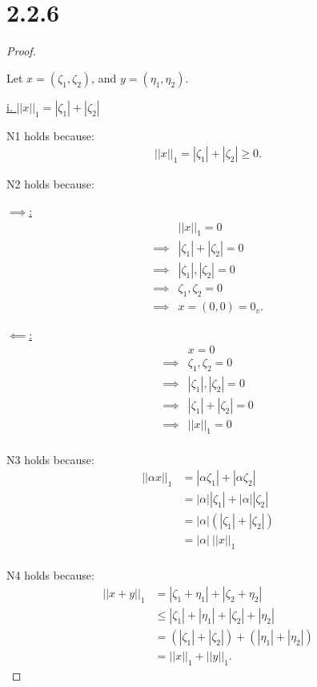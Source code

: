 \documentclass{article}
\begin{document}
\section*{2.2.6}
\begin{proof}
  $ $

  Let $x = (\zeta_1, \zeta_2)$, and $y = (\eta_1, \eta_2)$.
  \newline

  \underline{i. $||x||_1 = |\zeta_1| + |\zeta_2|$}
  \newline

  N1 holds because:
  \begin{align*}
    ||x||_1 = |\zeta_1| + |\zeta_2| \geq 0.
  \end{align*}

  N2 holds because:

  \underline{$\implies$:}
  \begin{align*}
    & ||x||_1 = 0 \\
    \implies& |\zeta_1| + |\zeta_2| = 0 \\
    \implies& |\zeta_1|, |\zeta_2| = 0 \\
    \implies& \zeta_1, \zeta_2 = 0 \\
    \implies& x = (0, 0) = 0_v.
  \end{align*}

  \underline{$\impliedby$:}
  \begin{align*}
    & x = 0 \\
    \implies& \zeta_1, \zeta_2 = 0 \\
    \implies& |\zeta_1|, |\zeta_2| = 0 \\
    \implies& |\zeta_1| + |\zeta_2| = 0 \\
    \implies& ||x||_1 = 0 \\
  \end{align*}

  N3 holds because:
  \begin{align*}
    ||\alpha x||_1 
    &= |\alpha \zeta_1| + |\alpha \zeta_2| \\
    &= |\alpha| |\zeta_1| + |\alpha| |\zeta_2| \\
    &= |\alpha| (|\zeta_1| + |\zeta_2|) \\
    &= |\alpha| \: ||x||_1 \\
  \end{align*}

  N4 holds because:
  \begin{align*}
    ||x+y||_1
    &= |\zeta_1 + \eta_1| + |\zeta_2 + \eta_2| \\
    &\leq |\zeta_1| + |\eta_1| + |\zeta_2| + |\eta_2| \\
    &= (|\zeta_1| + |\zeta_2|) + (|\eta_1| + |\eta_2|) \\
    &= ||x||_1 + ||y||_1.
  \end{align*}


\end{proof}
\end{document}
